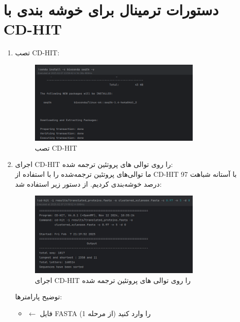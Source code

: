         \section{دستورات ترمینال برای خوشه بندی با CD-HIT}
        \begin{enumerate}
            \item تصب CD-HIT:
            \begin{figure}[H]
                \centering
                \includegraphics[width=0.8\textwidth]{images/install_cd-hit.png} %
                \caption{تصب CD-HIT}
                \label{fig:install_cd-hit}
            \end{figure}
            \item اجرای CD-HIT را روی توالی های پروتئین ترجمه شده:\\
            ما توالی‌های پروتئین ترجمه‌شده را با استفاده از CD-HIT با آستانه شباهت 97 درصد خوشه‌بندی کردیم. از دستور زیر استفاده شد:
            \begin{figure}[H]
                \centering
                \includegraphics[width=0.8\textwidth]{images/run_cd-hit.jpg} %
                \caption{اجرای CD-HIT را روی توالی های پروتئین ترجمه شده}
                \label{fig:run_cd-hit}
            \end{figure}
            توضیح پارامترها:
                \begin{itemize}
                    \item {} $\leftarrow$ فایل FASTA را وارد کنید (از مرحله 1)

\end{itemize}
\end{enumerate}
